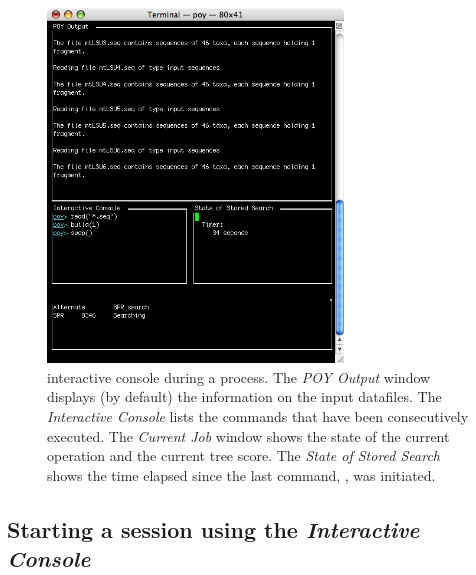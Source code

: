\begin{figure}[htbp]
   \centering
   \includegraphics[width=0.7\textwidth]{doc/figures/figprocess.jpg}
   \caption{\poy interactive console during a process. The \emph{POY Output} window displays (by default) the information on the input datafiles. The \emph{Interactive Console} lists the commands that have been consecutively executed. The \emph{Current Job} window shows the state of the current operation and the current tree score. The \emph{State of Stored Search} shows the time elapsed  since the last command, , was initiated.}
   \label{fig:figprocess}
\end{figure}


\subsection{Starting a \poy session using the \emph{Interactive Console}}


